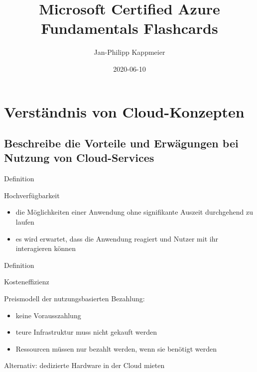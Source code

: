 \documentclass{scrartcl}
\newenvironment{flashcard}[2][]{%
    #1
    \vfill
    \centerline{\Large{#2}}
    \vfill
\newpage
}
{\newpage}
\newcommand{\sectioncard}[1]{
    \vspace*{\stretch{1}}
    \section{#1}
    \vspace*{\stretch{1}}
    \pagebreak
}
\newcommand{\subsectioncard}[1]{
    \vspace*{\stretch{1}}
    \subsection{#1}
    \vspace*{\stretch{1}}
    \pagebreak
}
\begin{document}
    \title{Microsoft Certified Azure Fundamentals Flashcards}
    \date{2020-06-10}
    \author{Jan-Philipp Kappmeier}

    \clearpage\maketitle
    \thispagestyle{empty}
    \pagebreak

    \sectioncard{Verständnis von Cloud-Konzepten}

    \subsectioncard{Beschreibe die Vorteile und Erwägungen bei Nutzung von Cloud-Services}

    \begin{flashcard}[Definition]{Hochverfügbarkeit}
        \begin{itemize}
            \item die Möglichkeiten einer Anwendung ohne signifikante Auszeit durchgehend zu laufen
            \item es wird erwartet, dass die Anwendung reagiert und Nutzer mit ihr interagieren können
        \end{itemize}
    \end{flashcard}

    \begin{flashcard}[Definition]{Kosteneffizienz}
        Preismodell der nutzungsbasierten Bezahlung:
        \begin{itemize}
            \item keine Vorausszahlung
            \item teure Infrastruktur muss nicht gekauft werden
            \item Ressourcen müssen nur bezahlt werden, wenn sie benötigt werden
        \end{itemize}

        \vspace{5mm}
        Alternativ: dedizierte Hardware in der Cloud mieten
    \end{flashcard}
\end{document}
